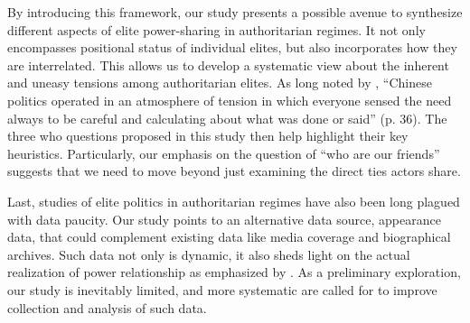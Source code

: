 \documentclass[11pt,english]{article}
\begin{document}
\begin{flushleft}
By introducing this framework, our study presents a possible avenue to synthesize different aspects of elite power-sharing in authoritarian regimes. It not only encompasses positional status of individual elites, but also incorporates how they are interrelated. This allows us to develop a systematic view about the inherent and uneasy tensions among authoritarian elites. As long noted by \citet{Pye1995}, ``Chinese politics operated in an atmosphere of tension in which everyone sensed the need always to be careful and calculating about what was done or said'' (p. 36). The three who questions proposed in this study then help highlight their key heuristics. Particularly, our emphasis on the question of ``who are our friends'' suggests that we need to move beyond just examining the direct ties actors share.

Last, studies of elite politics in authoritarian regimes have also been long plagued with data paucity. Our study points to an alternative data source, appearance data, that could complement existing data like media coverage and biographical archives. Such data not only is dynamic, it also sheds light on the actual realization of power relationship as emphasized by \citet{Dahl1961}. As a preliminary exploration, our study is inevitably limited, and more systematic are called for to improve collection and analysis of such data.

\newpage{}

\begin{spacing}{1}




\end{spacing}

\par\end{flushleft}
\end{document}
